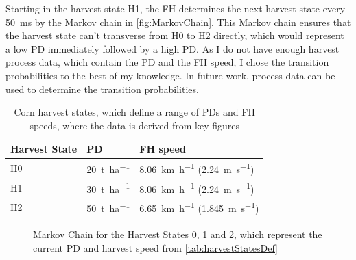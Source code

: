 Starting in the harvest state H1, the \ac{FH} determines the next harvest state every \SI{50}{\milli\second}
by the Markov chain in \autoref{fig:MarkovChain}.
This Markov chain ensures that the harvest state can't transverse from H0 to H2 directly, which would represent
a low \ac{PD} immediately followed by a high \ac{PD}.
As I do not have enough harvest process data, which contain the \ac{PD} and the \ac{FH} speed,
I chose the transition probabilities to the best of my knowledge.
In future work, process data can be used to determine
the transition probabilities.

\begin{table}[H]
	\centering
	\begin{tabular}{>{\centering}p{2cm}p{4cm}p{4cm}}
		\toprule
		Harvest State & \ac{PD} & \ac{FH} speed\\
		\midrule
		H0 & \SI{20}{\tonne\per\hectare}
        & \SI{8.06}{\kilo\metre\per\hour} (\SI{2.24}{\metre\per\second}) \\
		H1 & \SI{30}{\tonne\per\hectare}
        & \SI{8.06}{\kilo\metre\per\hour} (\SI{2.24}{\metre\per\second}) \\
		H2 & \SI{50}{\tonne\per\hectare}
        & \SI{6.65}{\kilo\metre\per\hour} (\SI{1.845}{\metre\per\second}) \\
		\bottomrule
	\end{tabular}
	\caption{Corn harvest states, which define a range of \acf{PD}s and \acf{FH} speeds, where the data is derived from
	key figures \cite{faustzahlen2018}}
	\label{tab:harvestStatesDef}
\end{table}

\begin{figure}[H]
\centering
{}
\caption{Markov Chain for the Harvest States 0, 1 and 2, which represent the current \ac{PD} and
harvest speed from \autoref{tab:harvestStatesDef}}
\label{fig:MarkovChain}
\end{figure}

